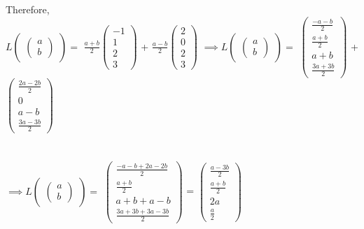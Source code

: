 \documentclass[45pt]{article}
\begin{document}
Therefore,\\
$L\begin{pmatrix} \begin{pmatrix} a\\b \end{pmatrix} \end{pmatrix} =$
$ \frac{a+b}{2} \begin{pmatrix} -1\\ 1\\2\\3 \end{pmatrix}$
+ 
$\frac{a-b}{2} \begin{pmatrix} 2\\0\\2\\3 \end{pmatrix}$
$\implies L\begin{pmatrix} \begin{pmatrix} a\\b \end{pmatrix} \end{pmatrix} =$
$ \begin{pmatrix} \frac{-a-b}{2} \\ \frac{a+b}{2} \\a+b\\ \frac{3a+3b}{2}  \end{pmatrix}$
+ 
$ \begin{pmatrix} \frac{2a-2b}{2}\\0\\a-b\\\frac{3a-3b}{2} \end{pmatrix}$\\\\\\
$\implies L\begin{pmatrix} \begin{pmatrix} a\\b \end{pmatrix} \end{pmatrix} =$
$ \begin{pmatrix} \frac{-a-b+2a-2b}{2} \\ \frac{a+b}{2} \\a+b+a-b\\ \frac{3a+3b+3a-3b}{2}  \end{pmatrix}$
= 
$ \begin{pmatrix} \frac{a-3b}{2}\\\frac{a+b}{2}\\2a\\\frac{a}{2} \end{pmatrix}$\\\\
\end{document}

